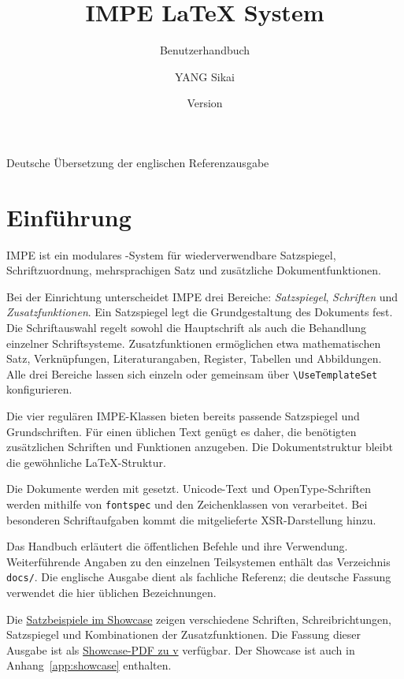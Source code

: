 \documentclass[11pt]{impeart}
\title{IMPE \LaTeX{} System}
\subtitle{Benutzerhandbuch}
\author{YANG Sikai}
\date{Version \IMPEVersion}
\newcommand{\IMPEShowcaseURL}{https://github.com/KelvinYangBK67/IMPE-LaTeX-System/blob/main/manual/showcase/impe-showcase.pdf}
\newcommand{\IMPETaggedShowcaseURL}{https://github.com/KelvinYangBK67/IMPE-LaTeX-System/releases/download/v\IMPEVersion/impe-showcase-\IMPEVersion.pdf}
\begin{document}
\maketitle

\begin{center}
\small Deutsche Übersetzung der englischen Referenzausgabe
\end{center}

\tableofcontents

\section{Einführung}

IMPE ist ein modulares \XeLaTeX{}-System für
wiederverwendbare Satzspiegel, Schriftzuordnung,
mehrsprachigen Satz und zusätzliche Dokumentfunktionen.

Bei der Einrichtung unterscheidet IMPE drei Bereiche:
\emph{Satzspiegel}, \emph{Schriften} und
\emph{Zusatzfunktionen}. Ein Satzspiegel legt die
Grundgestaltung des Dokuments fest. Die Schriftauswahl
regelt sowohl die Hauptschrift als auch die Behandlung
einzelner Schriftsysteme. Zusatzfunktionen ermöglichen
etwa mathematischen Satz, Verknüpfungen,
Literaturangaben, Register, Tabellen und Abbildungen.
Alle drei Bereiche lassen sich einzeln oder gemeinsam
über \verb|\UseTemplateSet| konfigurieren.

Die vier regulären IMPE-Klassen bieten bereits
passende Satzspiegel und Grundschriften.
Für einen üblichen Text genügt es daher, die
benötigten zusätzlichen Schriften und Funktionen
anzugeben. Die Dokumentstruktur bleibt die
gewöhnliche \LaTeX{}-Struktur.

Die Dokumente werden mit \XeLaTeX{} gesetzt.
Unicode-Text und OpenType-Schriften werden
mithilfe von \texttt{fontspec} und den
Zeichenklassen von \XeTeX{} verarbeitet.
Bei besonderen Schriftaufgaben kommt die
mitgelieferte XSR-Darstellung hinzu.

Das Handbuch erläutert die öffentlichen Befehle
und ihre Verwendung. Weiterführende Angaben
zu den einzelnen Teilsystemen enthält das
Verzeichnis \texttt{docs/}. Die englische
Ausgabe dient als fachliche Referenz;
die deutsche Fassung verwendet die
hier üblichen Bezeichnungen.

Die \href{\IMPEShowcaseURL}{Satzbeispiele im Showcase}
zeigen verschiedene Schriften, Schreibrichtungen,
Satzspiegel und Kombinationen der Zusatzfunktionen.
Die Fassung dieser Ausgabe ist als
\href{\IMPETaggedShowcaseURL}{Showcase-PDF zu v\IMPEVersion{}}
verfügbar. Der Showcase ist auch in
Anhang~\ref{app:showcase} enthalten.
\end{document}
